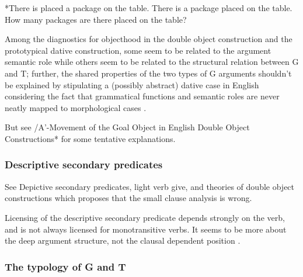 \documentclass[UTF8, a4paper, oneside, scheme=plain, 12pt]{ctexbook}
\begin{document}
\begin{exe}
    \ex \begin{xlist}
        \ex\label{ex:clause.dative.extraction.explanation.1.1} *There is placed a package on the table.
        \ex There is a package placed on the table.
        \ex *How many packages are there placed on the table?
    \end{xlist}
\end{exe}

Among the diagnostics for objecthood in the double object construction and the prototypical dative construction, 
some seem to be related to the argument semantic role 
while others seem to be related to the structural relation between G and T; 
further, the shared properties of the two types of G arguments
shouldn't be explained by stipulating a (possibly abstract) dative case in English 
considering the fact that grammatical functions and semantic roles are never neatly 
mapped to morphological cases \citep{maling2001dative}.

But see /A'-Movement  of  the  Goal  Object  in  English Double  Object  Constructions*  for some tentative explanations.

\subsubsection{Descriptive secondary predicates}

See Depictive secondary predicates, light verb give, and theories of double object constructions which proposes that the small clause analysis is wrong.

Licensing of the descriptive secondary predicate depends strongly on the verb, 
and is not always licensed for monotransitive verbs.
It seems to be more about the deep argument structure, 
not the clausal dependent position \citep{maling2001dative}.

\subsubsection{The typology of G and T}\label{sec:g-t-typology}
\end{document}
